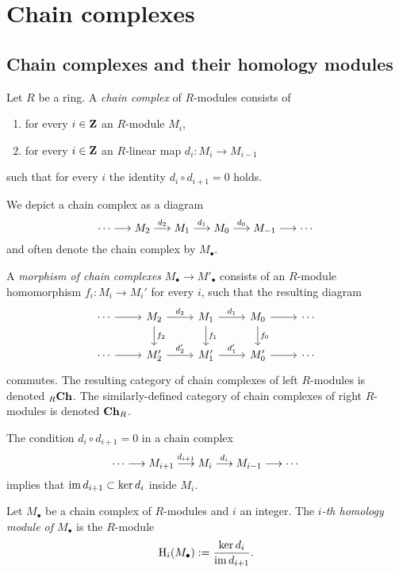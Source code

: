 
\chapter{Chain complexes}

\section{Chain complexes and their homology modules}


\begin{definition}
Let $R$ be a ring. A \emph{chain complex} of $R$-modules consists of
\begin{enumerate}
\item for every $i\in {\mathbf{Z}}$ an $R$-module $M_i$,
\item for every $i\in {\mathbf{Z}}$ an $R$-linear map $d_i\colon M_i \to M_{i-1}$
\end{enumerate}
such that for every $i$ the identity $d_i \circ d_{i+1} = 0 $ holds.
\end{definition}

We depict a chain complex as a diagram
\[
	\cdots \longrightarrow M_2 \overset{d_2}{\longrightarrow} M_1 \overset{d_1}{\longrightarrow}  M_0 
	\overset{d_0}{\longrightarrow} M_{-1} \longrightarrow \cdots 
\]
and often denote the chain complex by $M_\bullet$.

\begin{definition}
A \emph{morphism of chain complexes} $M_\bullet \to M'_\bullet$ consists of an $R$-module
homomorphism $f_i\colon M_i \to M_i'$ for every $i$, such that the resulting diagram
\[
\begin{tikzcd}
\cdots \arrow{r}
	& M_{2} \arrow{r}{d_{2}} \arrow{d}{f_{2}} 
	& M_{1} \arrow{r}{d_{1}} \arrow{d}{f_{1}} 
	& M_{0} \arrow{r} \arrow{d}{f_{0}} 
	& \cdots \\
\cdots \arrow{r}
	& M'_{2} \arrow{r}{d'_{2}} 
	& M'_{1} \arrow{r}{d'_{1}} 
	& M'_{0} \arrow{r} 
	& \cdots 
\end{tikzcd}
\]
commutes.  The resulting category of chain complexes of left $R$-modules is denoted 
${}_R\mathbf{Ch}$. The similarly-defined category of chain complexes of right $R$-modules is denoted $\mathbf{Ch}_R$.
\end{definition}

The condition $d_i \circ d_{i+1} = 0$ in a chain complex
 \[
	\cdots \longrightarrow M_{i+1} \overset{d_{i+1}}{\longrightarrow} M_i \overset{d_i}{\longrightarrow}  M_{i-1}
	\longrightarrow \cdots
\]
implies that $\operatorname{im} d_{i+1} \subset \ker d_i$ inside $M_i$. 

\begin{definition}
Let $M_\bullet$ be a chain complex of $R$-modules and $i$ an integer. The \emph{$i$-th homology module of $M_\bullet$} is the $R$-module
\[
	{\mathrm H}_i(M_\bullet) := \frac{\ker d_i}{\operatorname{im} d_{i+1}}.
\]
\end{definition}

